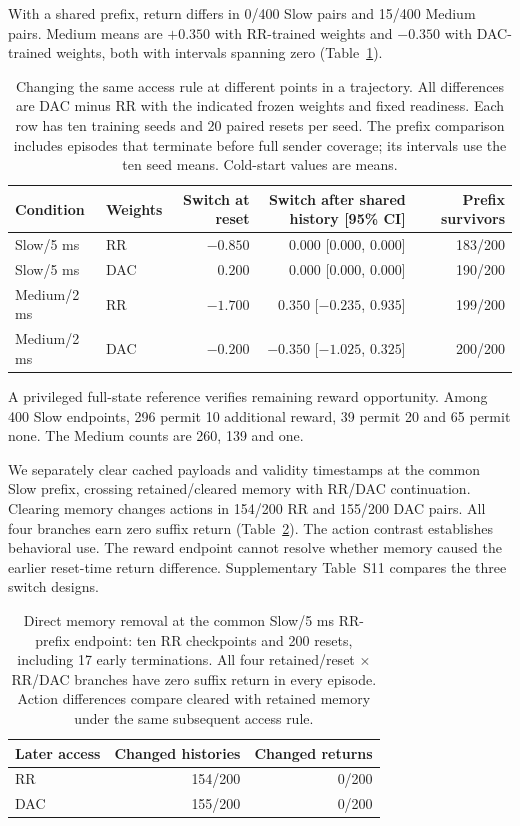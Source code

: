 \documentclass[pdflatex,sn-mathphys-num]{sn-jnl}
\begin{document}
With a shared prefix, return differs in 0/400 Slow pairs and 15/400 Medium pairs. Medium means are $+0.350$ with RR-trained weights and $-0.350$ with DAC-trained weights, both with intervals spanning zero (Table~\ref{tab:history_by_cohort}).
\begin{table}[htbp]\centering\normalsize
\caption{Changing the same access rule at different points in a trajectory. All differences are DAC minus RR with the indicated frozen weights and fixed readiness. Each row has ten training seeds and 20 paired resets per seed. The prefix comparison includes episodes that terminate before full sender coverage; its intervals use the ten seed means. Cold-start values are means.}\label{tab:history_by_cohort}
{\footnotesize\setlength{\tabcolsep}{1.3pt}\begin{tabular}{llrrr}\toprule
Condition & Weights & Switch at reset & Switch after shared history [95\% CI] & Prefix survivors\\\midrule
Slow/5 ms & RR & $-0.850$ & $0.000$ [$0.000$, $0.000$] & 183/200\\
Slow/5 ms & DAC & $0.200$ & $0.000$ [$0.000$, $0.000$] & 190/200\\
Medium/2 ms & RR & $-1.700$ & $0.350$ [$-0.235$, $0.935$] & 199/200\\
Medium/2 ms & DAC & $-0.200$ & $-0.350$ [$-1.025$, $0.325$] & 200/200\\
\bottomrule\end{tabular}}
\end{table}

A privileged full-state reference verifies remaining reward opportunity. Among 400 Slow endpoints, 296 permit 10 additional reward, 39 permit 20 and 65 permit none. The Medium counts are 260, 139 and one.

We separately clear cached payloads and validity timestamps at the common Slow prefix, crossing retained/cleared memory with RR/DAC continuation. Clearing memory changes actions in 154/200 RR and 155/200 DAC pairs. All four branches earn zero suffix return (Table~\ref{tab:memory_reset}). The action contrast establishes behavioral use. The reward endpoint cannot resolve whether memory caused the earlier reset-time return difference. Supplementary Table~S11 compares the three switch designs.
\begin{table}[htbp]\centering\normalsize
\caption{Direct memory removal at the common Slow/5 ms RR-prefix endpoint: ten RR checkpoints and 200 resets, including 17 early terminations. All four retained/reset $\times$ RR/DAC branches have zero suffix return in every episode. Action differences compare cleared with retained memory under the same subsequent access rule.}\label{tab:memory_reset}
\begin{tabular*}{\textwidth}{@{\extracolsep{\fill}}lrr@{}}\toprule
Later access & Changed histories & Changed returns\\\midrule
RR & 154/200 & 0/200\\
DAC & 155/200 & 0/200\\
\bottomrule\end{tabular*}
\end{table}
\end{document}
